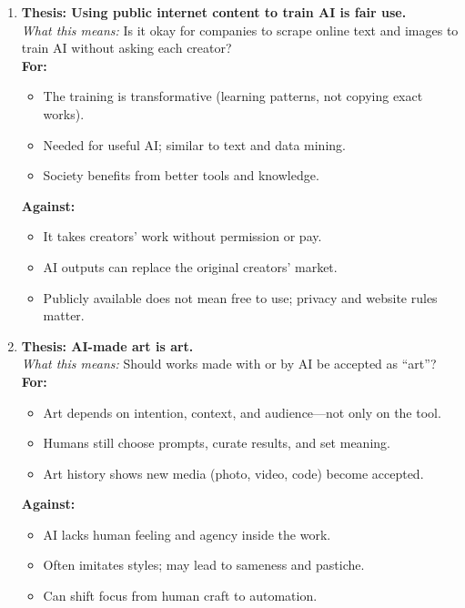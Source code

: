 \documentclass[12pt]{article}
\begin{document}
\begin{enumerate}
\item \textbf{Thesis: Using public internet content to train AI is fair use.}\\
\emph{What this means:} Is it okay for companies to scrape online text and images to train AI without asking each creator?\\
\textbf{For:}
\begin{itemize}
    \item The training is transformative (learning patterns, not copying exact works).
    \item Needed for useful AI; similar to text and data mining.
    \item Society benefits from better tools and knowledge.
\end{itemize}
\textbf{Against:}
\begin{itemize}
    \item It takes creators’ work without permission or pay.
    \item AI outputs can replace the original creators’ market.
    \item Publicly available does not mean free to use; privacy and website rules matter.
\end{itemize}

\item \textbf{Thesis: AI-made art is art.}\\
\emph{What this means:} Should works made with or by AI be accepted as ``art''?\\
\textbf{For:}
\begin{itemize}
    \item Art depends on intention, context, and audience—not only on the tool.
    \item Humans still choose prompts, curate results, and set meaning.
    \item Art history shows new media (photo, video, code) become accepted.
\end{itemize}
\textbf{Against:}
\begin{itemize}
    \item AI lacks human feeling and agency inside the work.
    \item Often imitates styles; may lead to sameness and pastiche.
    \item Can shift focus from human craft to automation.
\end{itemize}


\end{enumerate}
\end{document}
